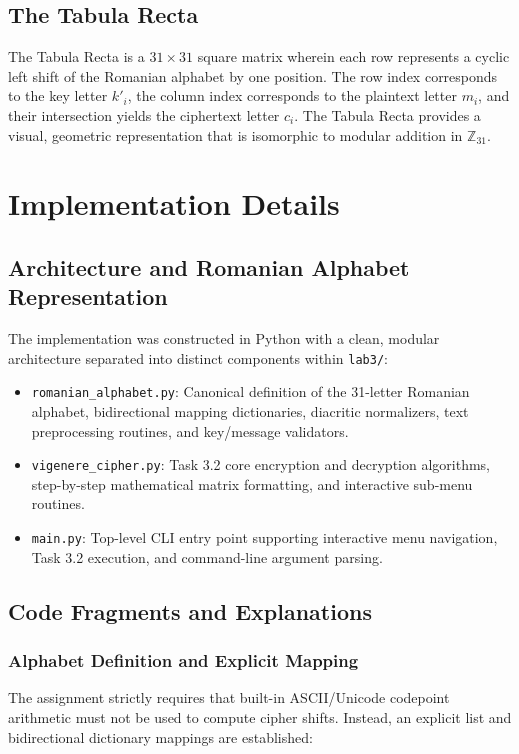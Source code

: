 \documentclass{labreport}
\begin{document}
\subsection{The Tabula Recta}

The Tabula Recta is a $31 \times 31$ square matrix wherein each row represents a cyclic left shift of the Romanian alphabet by one position. The row index corresponds to the key letter $k'_i$, the column index corresponds to the plaintext letter $m_i$, and their intersection yields the ciphertext letter $c_i$. The Tabula Recta provides a visual, geometric representation that is isomorphic to modular addition in $\mathbb{Z}_{31}$.

\section{Implementation Details}

\subsection{Architecture and Romanian Alphabet Representation}

The implementation was constructed in Python with a clean, modular architecture separated into distinct components within \texttt{lab3/}:
\begin{itemize}[noitemsep, topsep=2pt]
    \item \texttt{romanian\_alphabet.py}: Canonical definition of the 31-letter Romanian alphabet, bidirectional mapping dictionaries, diacritic normalizers, text preprocessing routines, and key/message validators.
    \item \texttt{vigenere\_cipher.py}: Task 3.2 core encryption and decryption algorithms, step-by-step mathematical matrix formatting, and interactive sub-menu routines.
    \item \texttt{main.py}: Top-level CLI entry point supporting interactive menu navigation, Task 3.2 execution, and command-line argument parsing.
\end{itemize}

\subsection{Code Fragments and Explanations}

\subsubsection{Alphabet Definition and Explicit Mapping}
The assignment strictly requires that built-in ASCII/Unicode codepoint arithmetic must not be used to compute cipher shifts. Instead, an explicit list and bidirectional dictionary mappings are established:
\end{document}
